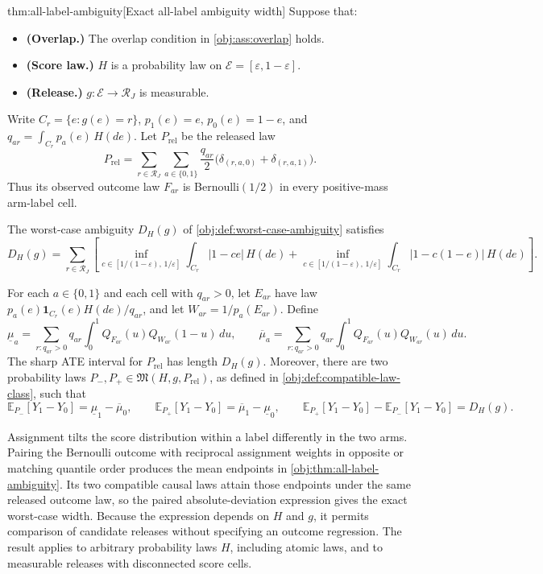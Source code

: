 \documentclass[11pt]{article}
\begin{document}
\begin{theoremv}{thm:all-label-ambiguity}[Exact all-label ambiguity width]
Suppose that:
\begin{itemize}
\item \textbf{(Overlap.)} The overlap condition in \cref{obj:ass:overlap} holds.
\item \textbf{(Score law.)} \(H\) is a probability law on \(\mathcal E=[\varepsilon,1-\varepsilon]\).
\item \textbf{(Release.)} \(g:\mathcal E\to\mathcal R_J\) is measurable.
\end{itemize}
Write \(C_r=\{e:g(e)=r\}\), \(p_1(e)=e\), \(p_0(e)=1-e\), and \(q_{ar}=\int_{C_r}p_a(e)\,H(de)\). Let \(P_{\mathrm{rel}}\) be the released law
\[
P_{\mathrm{rel}}
=\sum_{r\in\mathcal R_J}\sum_{a\in\{0,1\}}
\frac{q_{ar}}{2}\bigl(\delta_{(r,a,0)}+\delta_{(r,a,1)}\bigr).
\]
Thus its observed outcome law \(F_{ar}\) is Bernoulli\((1/2)\) in every positive-mass arm-label cell.

The worst-case ambiguity \(D_H(g)\) of \cref{obj:def:worst-case-ambiguity} satisfies
\[
D_H(g)=
\sum_{r\in\mathcal R_J}
\left[
\inf_{c\in[1/(1-\varepsilon),\,1/\varepsilon]}
\int_{C_r}|1-ce|\,H(de)
+
\inf_{c\in[1/(1-\varepsilon),\,1/\varepsilon]}
\int_{C_r}|1-c(1-e)|\,H(de)
\right].
\]

For each \(a\in\{0,1\}\) and each cell with \(q_{ar}>0\), let \(E_{ar}\) have law \(p_a(e)\mathbf 1_{C_r}(e)H(de)/q_{ar}\), and let \(W_{ar}=1/p_a(E_{ar})\). Define
\[
\underline\mu_a
=\sum_{r:q_{ar}>0}q_{ar}\int_0^1
Q_{F_{ar}}(u)Q_{W_{ar}}(1-u)\,du,
\qquad
\overline\mu_a
=\sum_{r:q_{ar}>0}q_{ar}\int_0^1
Q_{F_{ar}}(u)Q_{W_{ar}}(u)\,du.
\]
The sharp ATE interval for \(P_{\mathrm{rel}}\) has length \(D_H(g)\). Moreover, there are two probability laws \(P_-,P_+\in\mathfrak M(H,g,P_{\mathrm{rel}})\), as defined in \cref{obj:def:compatible-law-class}, such that
\[
\mathbb E_{P_-}[Y_1-Y_0]=\underline\mu_1-\overline\mu_0,
\qquad
\mathbb E_{P_+}[Y_1-Y_0]=\overline\mu_1-\underline\mu_0,
\qquad
\mathbb E_{P_+}[Y_1-Y_0]-\mathbb E_{P_-}[Y_1-Y_0]=D_H(g).
\]
\end{theoremv}

Assignment tilts the score distribution within a label differently in the two arms. Pairing the Bernoulli outcome with reciprocal assignment weights in opposite or matching quantile order produces the mean endpoints in \cref{obj:thm:all-label-ambiguity}. Its two compatible causal laws attain those endpoints under the same released outcome law, so the paired absolute-deviation expression gives the exact worst-case width. Because the expression depends on \(H\) and \(g\), it permits comparison of candidate releases without specifying an outcome regression. The result applies to arbitrary probability laws \(H\), including atomic laws, and to measurable releases with disconnected score cells.
\end{document}
